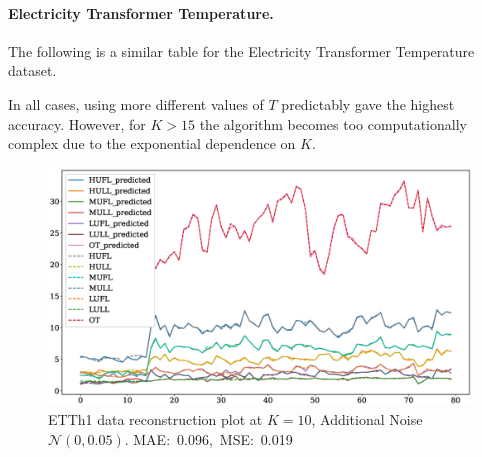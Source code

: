 \documentclass[12pt]{article}
\begin{document}
{\paragraph{Electricity Transformer Temperature.} The following is a similar table for the Electricity Transformer Temperature dataset.

In all cases, using more different values of $T$ predictably gave the highest accuracy. However, for $K > 15$ the algorithm becomes too computationally complex due to the exponential dependence on $K$.

\begin{figure}[!htbp]
	\centering
	\includegraphics[width=\textwidth]{ETT_time_series_K10N005.eps}
	\caption{ETTh1 data reconstruction plot at $K=10$, Additional Noise $\mathcal{N}(0, 0.05)$. \mbox{MAE: 0.096, MSE: 0.019}}
	\label{fig:fig6}
\end{figure}

}
\end{document}
